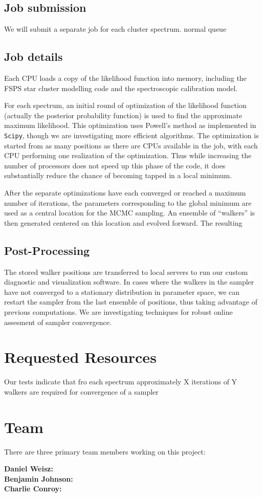 \documentclass[11pt,preprint]{aastex}
\begin{document}
\subsection{Job submission}
We will submit a separate job for each cluster spectrum. normal queue

\subsection{Job details}
Each CPU loads a copy of the likelihood function into memory,
including the FSPS star cluster modelling code and the spectroscopic
calibration model.

For each spectrum, an initial round of optimization of the likelihood
function (actually the posterior probability function) is used to find
the approximate maximum likelihood. This optimization uses Powell's
method as implemented in \texttt{Scipy}, though we are investigating
more efficient algorithms. The optimization is started from as many
positions as there are CPUs available in the job, with each CPU
performing one realization of the optimization.  Thus while increasing
the number of processors does not speed up this phase of the code, it
does substantially reduce the chance of becoming tapped in a local
minimum.

After the separate optimizations have each converged or reached a
maximum number of iterations, the parameters corresponding to the
global minimum are used as a central location for the MCMC sampling.
An ensemble of ``walkers'' is then generated centered on this location
and evolved forward.  The resulting 

\subsection{Post-Processing}
The stored walker positions are transferred to local servers to run
our custom diagnostic and visualization software.  In cases where the
walkers in the sampler have not converged to a stationary distribution
in parameter space, we can restart the sampler from the last ensemble
of positions, thus taking advantage of previous computations.  We are
investigating techniques for robust online assesment of sampler
convergence.


\section{Requested Resources}
Our tests indicate that fro each spectrum approximately X iterations
of Y walkers are required for convergence of a sampler





\clearpage

\section{Team}

There are three primary team members working on this project:

\textbf{Daniel Weisz:} \\

\textbf{Benjamin Johnson:} \\

\textbf{Charlie Conroy:}





\end{document}
